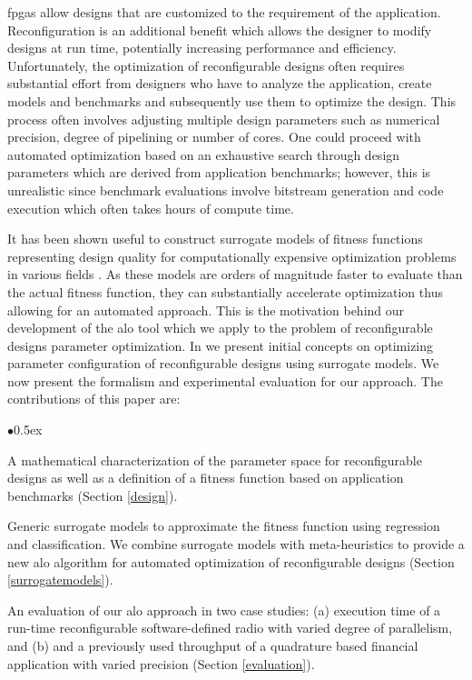 \documentclass[runningheads,a4paper]{llncs}
\begin{document}
\acp{fpga} allow designs that are customized to the requirement of the application. Reconfiguration is an additional benefit which allows the designer to modify designs at run time, potentially increasing performance and efficiency. Unfortunately, the optimization of reconfigurable designs often requires substantial effort from designers who have to analyze the application, create models and benchmarks and subsequently use them to optimize the design. This process often involves adjusting multiple design parameters such as numerical precision, degree of pipelining or number of cores. One could proceed with automated optimization based on an exhaustive search through design parameters which are derived from application benchmarks; however, this is unrealistic since benchmark evaluations involve bitstream generation and code execution which often takes hours of compute time.


It has been shown useful to construct surrogate models of fitness functions representing design quality for computationally expensive optimization problems in various fields \cite{1041556,surrogateModel,Su:2008:GPA:1494644.1494688,5194095,LeThi2002258}. As these models are orders of magnitude faster to evaluate than the actual fitness function, they can substantially accelerate optimization thus allowing for an automated approach. This is the motivation behind our development of the \ac{alo} tool which we apply to the problem of reconfigurable designs parameter optimization. In \cite{fpt2012MLO} we present initial concepts on optimizing parameter configuration of reconfigurable designs using surrogate models. We now present the formalism and experimental evaluation for our approach. The contributions of this paper are: 

\vspace{-0.5em}

\begin{list}{$\bullet$}{\itemsep 0.5ex}

\item A mathematical characterization of the parameter space for reconfigurable designs as well as a definition of a fitness function based on application benchmarks (Section \ref{design}).

\item Generic surrogate models to approximate the fitness function using regression and classification. We combine surrogate models with meta-heuristics to provide a new \ac{alo} algorithm for automated optimization of reconfigurable designs (Section \ref{surrogatemodels}).

\item An evaluation of our \ac{alo} approach in two case studies: (a) execution time of a run-time reconfigurable software-defined radio with varied degree of parallelism, and (b) and a previously used \cite{fpt2012MLO} throughput of a quadrature based financial application with varied precision (Section \ref{evaluation}).
\end{list}
\end{document}
